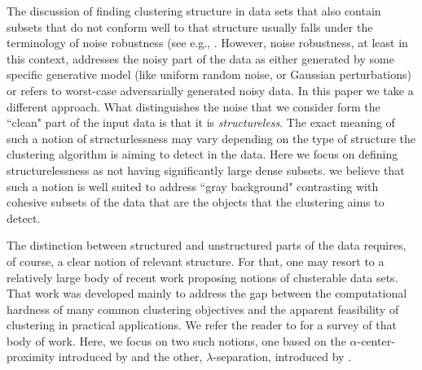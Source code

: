 \documentclass[anon,12pt]{colt2016} %
\begin{document}
The discussion of finding clustering structure in data sets that also contain subsets that do not conform well to that structure usually falls under the terminology of noise robustness (see e.g., \cite{balcan2012clustering, ackerman2009clusterability, ackerman2009clusterability,
cuesta1997trimmed, dave1993robust, garcia2008general}. However, noise robustness, at least in this context, addresses the noisy part of the data as either generated by some specific generative model (like uniform random noise, or Gaussian perturbations) or refers to worst-case adversarially generated noisy data. In this paper we take a different approach. What distinguishes the noise that we consider form the ``clean" part of the input data is that it is \emph{structureless}. The exact meaning of such a notion of structurlessness may vary depending on the type of structure the clustering algorithm is aiming to detect in the data. Here we focus on
defining structurelessness as  not having significantly large dense subsets. we believe that such a notion is well suited to address ``gray background" contrasting with cohesive subsets of the data that are the objects that the clustering aims to detect. 

The distinction between structured and unstructured parts of the data requires, of course, a clear notion of relevant structure. For that, one may resort to a relatively large body of recent work proposing notions of clusterable data sets. That work was developed mainly to address the gap between the computational hardness of many common clustering 
objectives and the apparent feasibility of clustering in practical applications. We refer the reader to \cite{ben2015computational} for a survey of that body of work.
Here, we focus on two such notions, one based on the $\alpha$-center-proximity introduced by \cite{awasthi2012center} and the other, $\lambda$-separation, introduced by \cite{ben2014clustering}.
\end{document}
